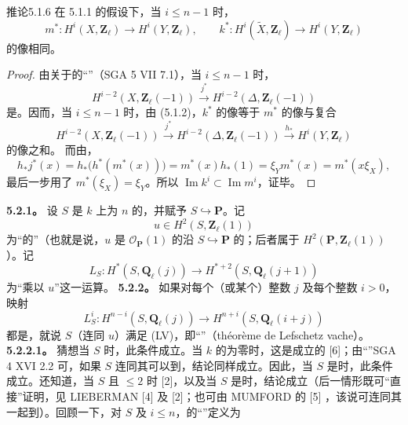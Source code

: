 \begin{SGAresult}{推论}{5.1.6}
在 5.1.1 的假设下，当 $i\leq n-1$ 时，
\[m^*:H^i(X,\mathbf Z_\ell)\longrightarrow H^i(Y,\mathbf Z_\ell),\qquad k^*:H^i(\widetilde X,\mathbf Z_\ell)\longrightarrow H^i(Y,\mathbf Z_\ell)\]
的像相同。
\end{SGAresult}
\begin{proof}
由关于的“”（SGA 5 VII 7.1），当 $i\leq n-1$ 时，
\begin{equation}\tag{5.1.7}H^{i-2}(X,\mathbf Z_\ell(-1))\xrightarrow{j^*}H^{i-2}(\Delta,\mathbf Z_\ell(-1))\end{equation}
是。因而，当 $i\leq n-1$ 时，由 (5.1.2)，$k^*$ 的像等于 $m^*$ 的像与复合
\[H^{i-2}(X,\mathbf Z_\ell(-1))\xrightarrow{j^*}H^{i-2}(\Delta,\mathbf Z_\ell(-1))\xrightarrow{h_*}H^i(Y,\mathbf Z_\ell)\]
的像之和。
而由，
\[h_*j^*(x)=h_*\bigl(h^*(m^*(x))\bigr)=m^*(x)h_*(1)=\xi_Ym^*(x)=m^*(x\xi_X),\]
最后一步用了 $m^*(\xi_X)=\xi_Y$。所以 $\operatorname{Im}k^i\subset\operatorname{Im}m^i$，证毕。
\end{proof}
\textbf{5.2.1。} 设 $S$ 是 $k$ 上为 $n$ 的，并赋予 $S\hookrightarrow\mathbf P$。记
\[u\in H^2(S,\mathbf Z_\ell(1))\]
为“的”（也就是说，$u$ 是 $\mathscr O_{\mathbf P}(1)$ 的沿 $S\hookrightarrow\mathbf P$ 的；后者属于 $H^2(\mathbf P,\mathbf Z_\ell(1))$）。记
\[L_S:H^*(S,\mathbf Q_\ell(j))\longrightarrow H^{*+2}(S,\mathbf Q_\ell(j+1))\]
为“乘以 $u$”这一运算。
\textbf{5.2.2。} 如果对每个（或某个）整数 $j$ 及每个整数 $i>0$，映射
\[L_S^i:H^{n-i}(S,\mathbf Q_\ell(j))\longrightarrow H^{n+i}(S,\mathbf Q_\ell(i+j))\]
都是，就说 $S$（连同 $u$）满足 (LV)，即“”（théorème de Lefschetz vache）。
\textbf{5.2.2.1。} 猜想当 $S$ 时，此条件成立。当 $k$ 的为零时，这是成立的 [6]；由“”SGA 4 XVI 2.2 可，如果 $S$ 连同其可以到，结论同样成立。因此，当 $S$ 是时，此条件成立。还知道，当 $S$ 且 $\leq2$ 时 [2]，以及当 $S$ 是时，结论成立（后一情形既可“直接”证明，见 LIEBERMAN [4] 及 [2]；也可由 MUMFORD 的 [5] ，该说可连同其一起到）。回顾一下，对 $S$ 及 $i\leq n$，的“”定义为
